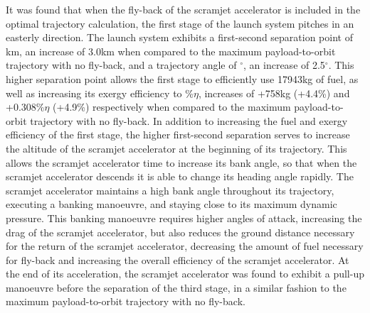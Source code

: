 It was found that when the fly-back of the scramjet accelerator is included in the optimal trajectory calculation, the first stage of the launch system pitches in an easterly direction. 
The launch system exhibits a first-second separation point of \firstsecondSeparationAltStandard km, an increase of 3.0km when compared to the maximum payload-to-orbit trajectory with no fly-back, and a trajectory angle of \firstsecondSeparationgammaStandard $^\circ$, an increase of 2.5$^\circ$. 
This higher separation point allows the first stage to efficiently use 17943kg of fuel, as well as increasing its exergy efficiency to \firstExergyEffStandard \%$\eta$, increases of +758kg (+4.4\%) and +0.308\%$\eta$ (+4.9\%) respectively when compared to the maximum payload-to-orbit trajectory with no fly-back.
In addition to increasing the fuel and exergy efficiency of the first stage, the higher first-second separation serves to increase the altitude of the scramjet accelerator at the beginning of its trajectory. This allows the scramjet accelerator time to increase its bank angle, so that when the scramjet accelerator descends it is able to change its heading angle rapidly. The scramjet accelerator maintains a high bank angle throughout its trajectory, executing a banking manoeuvre, and staying close to its maximum dynamic pressure. 
This banking manoeuvre requires higher angles of attack, increasing the drag of the scramjet accelerator, but also reduces the ground distance necessary for the return of the scramjet accelerator, decreasing the amount of fuel necessary for fly-back and increasing the overall efficiency of the scramjet accelerator. 
At the end of its acceleration, the scramjet accelerator was found to exhibit a pull-up manoeuvre before the separation of the third stage, in a similar fashion to the maximum payload-to-orbit trajectory with no fly-back. 


